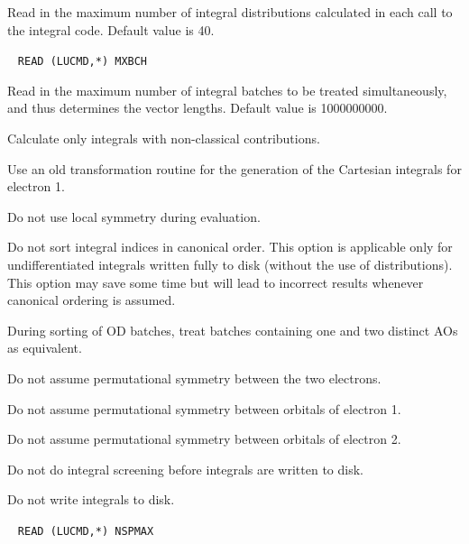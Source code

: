 \begin{description}
Read in the maximum number of integral distributions calculated in
each call to the integral code. Default value is 40.

\item[\Key{MXBCH}]\verb| |\newline
\verb|READ (LUCMD,*) MXBCH|

Read in the maximum number of integral batches to be treated
simultaneously, and thus determines the vector lengths. Default value
is 1000000000.

\item[\Key{NCLERI}] Calculate only integrals with non-classical
contributions.

\item[\Key{NEWCR1}] Use an old transformation routine for the
  generation of the Cartesian integrals for electron 1.

\item[\Key{NOLOCS}] Do not use local symmetry during evaluation.

\item[\Key{NONCAN}] Do not sort integral indices in canonical
order. This option is applicable only for undifferentiated integrals
written fully to disk (without the use of distributions). This option
may save some time but will lead to incorrect results whenever
canonical ordering is assumed.

\item[\Key{NO12GS}] During sorting of OD batches, treat batches
containing one and two distinct AOs as equivalent.

\item[\Key{NOPS12}] Do not assume permutational symmetry between the
two electrons.

\item[\Key{NOPSAB}] Do not assume permutational symmetry between
orbitals of electron 1.

\item[\Key{NOPSCD}] Do not assume permutational symmetry between
orbitals of electron 2.
 
\item[\Key{NOSCRE}] Do not do integral screening before integrals are
  written to disk.

\item[\Key{NOWRIT}] Do not write integrals to disk.

\item[\Key{NSPMAX}]\verb| |\newline
\verb|READ (LUCMD,*) NSPMAX| 


\end{description}
